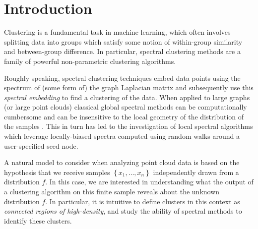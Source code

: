 \documentclass{article}
\newcommand{\set}[1]{\left\{#1\right\}}
\theoremstyle{aldenthm}
\theoremstyle{remark}
\begin{document}

\printAffiliationsAndNotice{} %

\begin{abstract}
\end{abstract}

\section{Introduction}
\label{introduction}

Clustering is a fundamental task in machine learning, which often involves splitting data into groups which satisfy some notion of within-group similarity and between-group difference. In particular, spectral clustering methods are a family of powerful non-parametric clustering algorithms. 

Roughly speaking, spectral clustering techniques
embed data points using the spectrum of (some
form of) the graph Laplacian matrix and subsequently 
use this \emph{spectral embedding} to find a clustering of the data.
When applied to large graphs (or large point clouds) classical global spectral 
methods can be computationally cumbersome and 
can be insensitive to the local geometry of the distribution of the samples
\citep{mahoney2012,leskovec2010}.
This in turn has led to the investigation of local spectral algorithms \citep{spielman2013,anderson2006,leskovec2010}
which leverage locally-biased spectra computed using random walks around 
a user-specified seed node. 

A natural model to consider when analyzing point cloud data is based on the hypothesis that we receive samples $\set{x_1, \ldots, x_n}$ independently drawn from a distribution $f$. In this case, we are interested in understanding what the output of a clustering algorithm on this finite sample reveals about the unknown distribution $f$. In particular, it is intuitive \cite{hartigan1981,chaudhuri2010} to define clusters in this context as \emph{connected regions of high-density}, and study the ability of spectral methods to identify these clusters.
\end{document}
